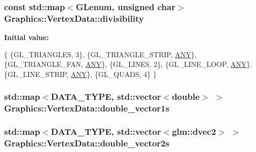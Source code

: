 \subsubsection[{divisibility}]{\setlength{\rightskip}{0pt plus 5cm}const std\+::map$<$G\+Lenum, unsigned char$>$ Graphics\+::\+Vertex\+Data\+::divisibility\hspace{0.3cm}{\ttfamily [private]}}\label{class_graphics_1_1_vertex_data_a4a88da3318b4c8deff9fa6168e75dd0a}
{\bfseries Initial value\+:}
\begin{DoxyCode}
\{
        \{GL\_TRIANGLES, 3\},
        \{GL\_TRIANGLE\_STRIP, \hyperlink{class_graphics_1_1_vertex_data_a0fc546e15f8fc02868e94246b93dd1b5}{ANY}\},
        \{GL\_TRIANGLE\_FAN, \hyperlink{class_graphics_1_1_vertex_data_a0fc546e15f8fc02868e94246b93dd1b5}{ANY}\},
        \{GL\_LINES, 2\},
        \{GL\_LINE\_LOOP, \hyperlink{class_graphics_1_1_vertex_data_a0fc546e15f8fc02868e94246b93dd1b5}{ANY}\},
        \{GL\_LINE\_STRIP, \hyperlink{class_graphics_1_1_vertex_data_a0fc546e15f8fc02868e94246b93dd1b5}{ANY}\},
        \{GL\_QUADS, 4\}
      \}
\end{DoxyCode}
\hypertarget{class_graphics_1_1_vertex_data_ae9a48ea752fa50a024958139cc588c66}{}
\subsubsection[{double\+\_\+vector1s}]{\setlength{\rightskip}{0pt plus 5cm}std\+::map$<${\bf D\+A\+T\+A\+\_\+\+T\+Y\+P\+E}, std\+::vector$<$double$>$ $>$ Graphics\+::\+Vertex\+Data\+::double\+\_\+vector1s\hspace{0.3cm}{\ttfamily [private]}}\label{class_graphics_1_1_vertex_data_ae9a48ea752fa50a024958139cc588c66}
\hypertarget{class_graphics_1_1_vertex_data_a0d9340ce408b8d5066524f440bc41067}{}
\subsubsection[{double\+\_\+vector2s}]{\setlength{\rightskip}{0pt plus 5cm}std\+::map$<${\bf D\+A\+T\+A\+\_\+\+T\+Y\+P\+E}, std\+::vector$<$glm\+::dvec2$>$ $>$ Graphics\+::\+Vertex\+Data\+::double\+\_\+vector2s\hspace{0.3cm}{\ttfamily [private]}}\label{class_graphics_1_1_vertex_data_a0d9340ce408b8d5066524f440bc41067}
\hypertarget{class_graphics_1_1_vertex_data_acd623a5856ffac27e3cd51b4202def6d}{}
